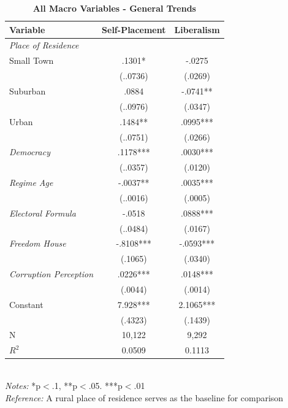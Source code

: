 \documentclass[12pt, titlepage]{article}
\newcommand\e{\emph}
\newcommand\tb{\textbf}
\begin{document}
\begin{table}[h!]
	\centering
	\caption{\tb{All Macro Variables - General Trends}}
	\begin{tabulary}{\linewidth}{l c c}
	\\
	\hline
	\tb{Variable}&\tb{Self-Placement}&\tb{Liberalism} \\
	\hline
	\e{Place of Residence} & & \\
	Small Town &.1301*&-.0275 \\
	&(..0736)&(.0269) \\
	Suburban& .0884& -.0741** \\
	&(..0976)& (.0347) \\
	Urban&.1484** & .0995*** \\
	&(..0751) & (.0266) \\
	\e{Democracy}& .1178***& .0030***\\
	&(..0357) & (.0120)\\
	\e{Regime Age} & -.0037** & .0035***\\
	&(..0016) & (.0005)\\
	\e{Electoral Formula}&-.0518& .0888***\\
	&(..0484) & (.0167) \\
	\e{Freedom House}& -.8108*** &-.0593*** \\
	&(.1065) & (.0340)  \\
	\e{Corruption Perception}&.0226***&.0148*** \\
	&(.0044)& (.0014)  \\
	\hline
	Constant& 7.928*** & 2.1065*** \\
	&(.4323) & (.1439)\\
	N&10,122 & 9,292 \\
	$R^2$&0.0509& 0.1113 \\
	\hline
	\end{tabulary}
	\\
\e{Notes:} *p$<$.1, **p$<$.05. ***p$<$.01 \\
\e{Reference:} A rural place of residence serves as the baseline for comparison
\label{table15}
\end{table}
\end{document}

